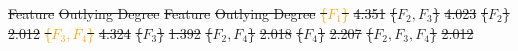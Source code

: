 \documentclass[
 size=14pt,
 paper=smartboard,  %
 mode=present, 		%
 display=slides, 	%
 style=tuliplab,  	%
 pauseslide,
 fleqn,leqno]{powerdot}
\providecommand{\DIFdeltex}[1]{{\protect\color{red}\sout{#1}}}                      %
\providecommand{\DIFdelbegin}{} %
\providecommand{\DIFdelend}{} %
\providecommand{\DIFdelFL}[1]{\DIFdel{#1}} %
\providecommand{\DIFdelbeginFL}{} %
\providecommand{\DIFdel}[1]{\texorpdfstring{\DIFdeltex{#1}}{}} %
\newcommand{\DIFscaledelfig}{0.5}
\newlength{\DIFdelgraphicswidth} %
\newlength{\DIFdelgraphicsheight} %
\newcommand{\DIFdelincludegraphics}[2][]{%
\sbox{\DIFdelgraphicsbox}{\DIFOincludegraphics[#1]{#2}}%
\settoboxwidth{\DIFdelgraphicswidth}{\DIFdelgraphicsbox} %
\settoboxtotalheight{\DIFdelgraphicsheight}{\DIFdelgraphicsbox} %
\scalebox{\DIFscaledelfig}{%
\parbox[b]{\DIFdelgraphicswidth}{\usebox{\DIFdelgraphicsbox}\\[-\baselineskip] \rule{\DIFdelgraphicswidth}{0em}}\llap{\resizebox{\DIFdelgraphicswidth}{\DIFdelgraphicsheight}{%
\setlength{\unitlength}{\DIFdelgraphicswidth}%
\begin{picture}(1,1)%
\thicklines\linethickness{2pt} %
{\color[rgb]{1,0,0}\put(0,0){\framebox(1,1){}}}%
{\color[rgb]{1,0,0}\put(0,0){\line( 1,1){1}}}%
{\color[rgb]{1,0,0}\put(0,1){\line(1,-1){1}}}%
\end{picture}%
}\hspace*{3pt}}} %
} %
\DeclareRobustCommand{\DIFdelbegin}{\DIFOdelbegin \let\includegraphics\DIFdelincludegraphics} %
\DeclareRobustCommand{\DIFdelend}{\DIFOaddend \let\includegraphics\DIFOincludegraphics} %
\DeclareRobustCommand{\DIFdelbeginFL}{\DIFOdelbeginFL \let\includegraphics\DIFdelincludegraphics} %
\begin{document}
\DIFdelbeginFL %
  \DIFdelFL{Feature }%
\DIFdelFL{Outlying Degree }%
\DIFdelFL{Feature }%
\DIFdelFL{Outlying Degree }%
\DIFdelFL{\textcolor{orange}{\{$F_1$\}}  }%
\DIFdelFL{4.351  }%
\DIFdelFL{\{$F_2, F_3$\}  }%
\DIFdelFL{4.023 }%
\DIFdelFL{\{$F_2$\}  }%
\DIFdelFL{2.012                      }%
\DIFdelFL{\textcolor{orange}{\{$F_3, F_4$\}} }%
\DIFdelFL{4.324 }%
\DIFdelFL{\{$F_3$\}  }%
\DIFdelFL{1.392                      }%
\DIFdelFL{\{$F_2, F_4$\} }%
\DIFdelFL{2.018 }%
\DIFdelFL{\{$F_4$\}  }%
\DIFdelFL{2.207                      }%
\DIFdelFL{\{$F_2, F_3, F_4$\} }%
\DIFdelFL{2.012 }%
\DIFdelend %

\DIFdelbegin %
\DIFdelend %
\end{document}
